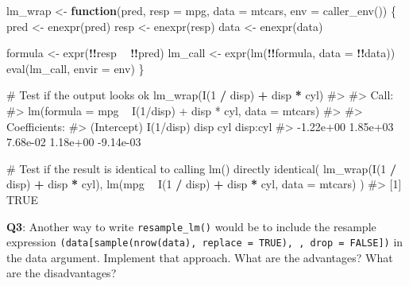 \documentclass[
]{krantz}
\makeatletter
\newenvironment{Shaded}{\begin{snugshade}}{\end{snugshade}}
\newcommand{\CommentTok}[1]{\textcolor[rgb]{0.56,0.35,0.01}{\textit{#1}}}
\newcommand{\ControlFlowTok}[1]{\textcolor[rgb]{0.13,0.29,0.53}{\textbf{#1}}}
\newcommand{\DataTypeTok}[1]{\textcolor[rgb]{0.13,0.29,0.53}{#1}}
\newcommand{\DecValTok}[1]{\textcolor[rgb]{0.00,0.00,0.81}{#1}}
\newcommand{\KeywordTok}[1]{\textcolor[rgb]{0.13,0.29,0.53}{\textbf{#1}}}
\newcommand{\NormalTok}[1]{#1}
\newcommand{\OperatorTok}[1]{\textcolor[rgb]{0.81,0.36,0.00}{\textbf{#1}}}
\newcommand{\StringTok}[1]{\textcolor[rgb]{0.31,0.60,0.02}{#1}}
\newenvironment{kframe}{%
\medskip{}
\setlength{\fboxsep}{.8em}
 \def\at@end@of@kframe{}%
 \ifinner\ifhmode%
  \def\at@end@of@kframe{\end{minipage}}%
  \begin{minipage}{\columnwidth}%
 \fi\fi%
 \def\FrameCommand##1{\hskip\@totalleftmargin \hskip-\fboxsep
 \colorbox{shadecolor}{##1}\hskip-\fboxsep
     \hskip-\linewidth \hskip-\@totalleftmargin \hskip\columnwidth}%
 \MakeFramed {\advance\hsize-\width
   \@totalleftmargin\z@ \linewidth\hsize
   \@setminipage}}%
 {\par\unskip\endMakeFramed%
 \at@end@of@kframe}
\renewenvironment{Shaded}{\begin{kframe}}{\end{kframe}}
\renewcommand{\KeywordTok} [1]{\textcolor[rgb]{0.00,0.44,0.13}{{#1}}}
\renewcommand{\DataTypeTok}[1]{\textcolor[rgb]{0.56,0.13,0.00}{{#1}}}
\renewcommand{\DecValTok}  [1]{\textcolor[rgb]{0.25,0.63,0.44}{{#1}}}
\renewcommand{\StringTok}  [1]{\textcolor[rgb]{0.25,0.44,0.63}{{#1}}}
\renewcommand{\CommentTok} [1]{\textcolor[rgb]{0.38,0.63,0.69}{{#1}}}
\renewcommand{\NormalTok}  [1]{{#1}}
\makeatother
\begin{document}
\begin{Shaded}
\begin{Highlighting}[]
\NormalTok{lm_wrap <-}\StringTok{ }\ControlFlowTok{function}\NormalTok{(pred, }\DataTypeTok{resp =}\NormalTok{ mpg, }\DataTypeTok{data =}\NormalTok{ mtcars, }\DataTypeTok{env =} \KeywordTok{caller_env}\NormalTok{()) \{}
\NormalTok{  pred <-}\StringTok{ }\KeywordTok{enexpr}\NormalTok{(pred)}
\NormalTok{  resp <-}\StringTok{ }\KeywordTok{enexpr}\NormalTok{(resp)}
\NormalTok{  data <-}\StringTok{ }\KeywordTok{enexpr}\NormalTok{(data)}
  
\NormalTok{  formula <-}\StringTok{ }\KeywordTok{expr}\NormalTok{(}\OperatorTok{!!}\NormalTok{resp }\OperatorTok{~}\StringTok{ }\OperatorTok{!!}\NormalTok{pred)}
\NormalTok{  lm_call <-}\StringTok{ }\KeywordTok{expr}\NormalTok{(}\KeywordTok{lm}\NormalTok{(}\OperatorTok{!!}\NormalTok{formula, }\DataTypeTok{data =} \OperatorTok{!!}\NormalTok{data))}
  \KeywordTok{eval}\NormalTok{(lm_call, }\DataTypeTok{envir =}\NormalTok{ env)}
\NormalTok{\}}

\CommentTok{# Test if the output looks ok}
\KeywordTok{lm_wrap}\NormalTok{(}\KeywordTok{I}\NormalTok{(}\DecValTok{1} \OperatorTok{/}\StringTok{ }\NormalTok{disp) }\OperatorTok{+}\StringTok{ }\NormalTok{disp }\OperatorTok{*}\StringTok{ }\NormalTok{cyl)}
\CommentTok{#> }
\CommentTok{#> Call:}
\CommentTok{#> lm(formula = mpg ~ I(1/disp) + disp * cyl, data = mtcars)}
\CommentTok{#> }
\CommentTok{#> Coefficients:}
\CommentTok{#> (Intercept)    I(1/disp)         disp          cyl     disp:cyl  }
\CommentTok{#>   -1.22e+00     1.85e+03     7.68e-02     1.18e+00    -9.14e-03}

\CommentTok{# Test if the result is identical to calling lm() directly}
\KeywordTok{identical}\NormalTok{(}
  \KeywordTok{lm_wrap}\NormalTok{(}\KeywordTok{I}\NormalTok{(}\DecValTok{1} \OperatorTok{/}\StringTok{ }\NormalTok{disp) }\OperatorTok{+}\StringTok{ }\NormalTok{disp }\OperatorTok{*}\StringTok{ }\NormalTok{cyl),}
  \KeywordTok{lm}\NormalTok{(mpg }\OperatorTok{~}\StringTok{ }\KeywordTok{I}\NormalTok{(}\DecValTok{1} \OperatorTok{/}\StringTok{ }\NormalTok{disp) }\OperatorTok{+}\StringTok{ }\NormalTok{disp }\OperatorTok{*}\StringTok{ }\NormalTok{cyl, }\DataTypeTok{data =}\NormalTok{ mtcars)}
\NormalTok{)}
\CommentTok{#> [1] TRUE}
\end{Highlighting}
\end{Shaded}

\textbf{{Q3}}: Another way to write \texttt{resample\_lm()} would be to include the resample expression \texttt{(data{[}sample(nrow(data),\ replace\ =\ TRUE),\ ,\ drop\ =\ FALSE{]})} in the data argument. Implement that approach. What are the advantages? What are the disadvantages?
\end{document}
